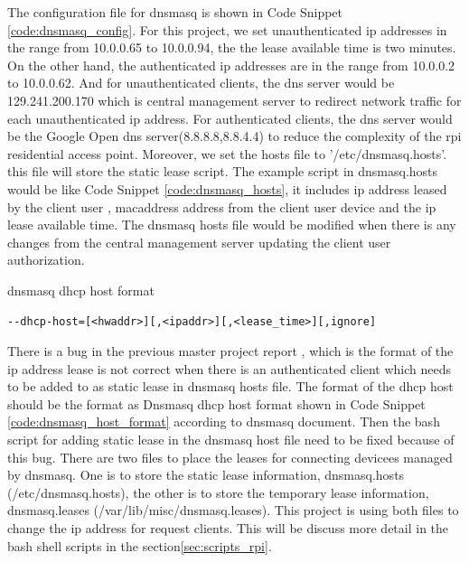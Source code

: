 \par The configuration file for dnsmasq is shown in Code Snippet \ref{code:dnsmasq_config}. For this project, we set unauthenticated \gls{ip} addresses in the range from 10.0.0.65 to 10.0.0.94, the the lease available time is two minutes. On the other hand, the authenticated \gls{ip} addresses are in the range from 10.0.0.2 to 10.0.0.62. And for unauthenticated clients, the \gls{dns} server would be 129.241.200.170 which is central management server to redirect network traffic for each unauthenticated \gls{ip} address. For authenticated clients, the \gls{dns} server would be the Google Open \gls{dns} server(8.8.8.8,8.8.4.4) to reduce the complexity of the \gls{rpi} residential access point. Moreover, we set the hosts file to '/etc/dnsmasq.hosts'. this file will store the static lease script. The example script in dnsmasq.hosts would be like Code Snippet \ref{code:dnsmasq_hosts}, it includes \gls{ip} address leased by the client user , \gls{macaddress} address from the client user device and the \gls{ip} lease available time. The dnsmasq hosts file would be modified when there is any changes from the central management server updating the client user authorization. 
\begin{algorithm}[h]
  \caption{dnsmasq dhcp host format}
  \label{code:dnsmasq_host_format}
  \begin{verbatim}
--dhcp-host=[<hwaddr>][,<ipaddr>][,<lease_time>][,ignore]
 \end{verbatim}
\end{algorithm}
\par There is a bug in the previous master project report \cite{TorgeirMR}, which is the format of the \gls{ip} address lease is not correct when there is an authenticated client which needs to be added to as static lease in dnsmasq hosts file. The format of the dhcp host should be the format as Dnsmasq dhcp host format shown in Code Snippet \ref{code:dnsmasq_host_format} according to dnsmasq document\cite{dnsmasq_doc}. Then the bash script for adding static lease in the dnsmasq host file need to be fixed because of this bug. There are two files to place the leases for connecting devicees managed by dnsmasq. One is to store the static lease information, dnsmasq.hosts (/etc/dnsmasq.hosts), the other is to store the temporary lease information, dnsmasq.leases (/var/lib/misc/dnsmasq.leases). This project is using both files to change the \gls{ip} address for request clients. This will be discuss more detail in the bash shell scripts in the section\ref{sec:scripts_rpi}.

